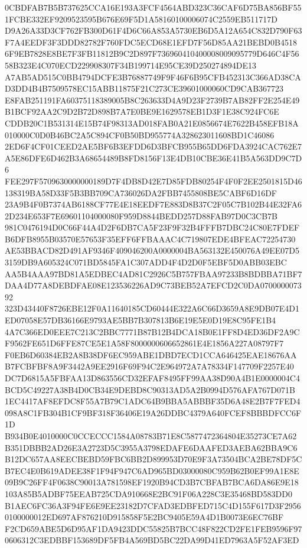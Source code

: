 \documentclass[UTF8,fontset=fandol,zihao=-4,a4paper]{ctexart}
\begin{document}
{{0CBDFAB7B5B737625CCA16E193A3FCF4564ABD323C36CAF6D75BA856BF551FCBE332EF9209523595B676E69F5D1A58160100006074C2559EB511717D
D9A26A33D3CF762FB300D61F4D6C66A853A5730EB6D5A12A654C832D790F63F7A4EEDF3F3DDD82782F760FDC5ECD68E1EFD7F56D85AA21BEBD0B4518
6F9EB7828E8BE7F3FB11812B9C2D897F736960410400008009095779D646C4F5658B323E4C070ECD229908307F34B199714E95CE39D250274894DE13
A7AB5AD515C0BB4794DCFE3B76887749F9F46F6B95CFB452313C366AD38CAD3DD4B4B7509578EC15ABB11875F21C273CE39601000060CD9CAB367723
E8FAB251191FA60375118389005B8C263633D4A9D23F2739B7AB82FF2E254E49B1BCF92AA2C9D2B72D898B7A7E0BE9E1629578EB1D3F1E38C924FC6E
CDDB20C1B531314E15B74F98313AD018FAB0A21E0856674E7622B458EFB18A010000C0D0B46BC2A5C894CF0B50BD955774A328623011608BD1C46086
2ED6F4CF01CEED2AE5BF6B3EFDD6D3BFCB955B65DD6FDA3924CAC762E7A5E86DFE6D462B3A68654489B8FD8156F13E4DB10CBE36E41B5A563DD9C7D6
FEE297F5709630000000189D7F4DB8D42E7D85FDB80254F4F0F2EE2501815D46138319BA58D33F5B3BB709CA736026DA2FBB7455808BE5CABF6D16DF
23A9B4F0B7374AB6188CF77E4E18EEDF7E883D8B37C2F05C7B102B44E32FA62D234E653F7E69601104000080F959D8844BEDD257D88FAB97D0C3CB7B
981C0476194D0C66F44A4D2F6DB7CA5F23F9F32B4FFFB7DBC24C80E7FDEFB6DFB8955B03570E57653F35EFF6FFBAAAC4C719807EDE4BFEAC72254730
AE53BBACD82D491AF9346F409046200A0000004BA563132E450076A49EE07D53159DB9A605324C071BD5845FA1C307ADD4F4D2D0F5EBF5D0ABB03EBC
AA5B4AAA97BD81A5EDBEC4AD81C2926C5B757FBAA97233B8BDBBA71BF7DAA4D77A8DEBDFAE08E123536226AD9C73BEB52A7EFCD2C0DA070000007392
323D43440F8726EBE12F0A11640185CD60444E322A6C66D3659A8E9DB07E4D1ED07058E57DB36166E9793AE5BB7B307813B6E19E5E0D19E8C95FE1B4
4A7C366ED0EEE7C213C2BBC7771B87B12B4DCA18B0E1FF8D4ED36DF2A9CF9562FE651D6FFE87CE5E1A58F8000000606652861E4E1856A227A08797F7
F0EB6D60384EB2A8B38DF6EC959ABE1DBD7ECD1CCA646425EAE18676AAB7FCBFBF8A9F3442A9EE2916F69F94C2E964972A7A78334F147709F2257E40
DC7D6815A5FBFAA13D863556CD32EFAF8495FF99AA38D90A4B1E0000004C4BCD5C49227A38B4D0CB34E9DEBD8C90313AD5A2B0994D576AFA767D071B
1EC4417AF8EFDC8F55A7B79C1ADC64B9BBA5ABBBF35D6A48E2B7F7FED4098A8C1FB304B1CF9BF318F36406E19A26DDBC4379A640FCEF8BBBDFCC6F1D
B934B0E4010000C0CCECCC1584A08783B71E8C5877472364804E35273CE7A62B351DBBB2AD26E3A2723D5C3955A3798EDAFE6DAAFED3AEBA62BBA9C6
B12DC657AA8EECBEBD59FBC6BB2D899953D70E9F3A73504BCA2BE78DF5CB7EC4E0B619ADEE38F1F94F947C6AD965BD03000080C959B62B0EF99A1E8E
09B9C26FF4F0638C90013A781598EF1920B94CD3B7CBFAB7BCA6DA86E9E18103A85B5ADBF75EEAB725CDA910668E2BC91F06A228C3E35468BD583DD0
B1AEC6FC36A3F94FE6E9EE23182D7CFAD3EDBFED715C4D155F617D3F29560100000012ED697AF876210D915858F5E2BC9405E59A4D1B0073E6EC76BF
F2CD659ABE5D6D95AF1DA9423DDC55825B7BCC48F822CD2FE1FEB9596F970606312C3EDBBF153689DF5FB4A569BD5BC22DA99D41ED7963A5F52AF3ED
}}
\end{document}
